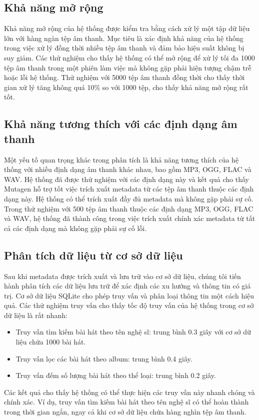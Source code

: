 \documentclass[conference]{IEEEtran}
\begin{document}
\subsection{Khả năng mở rộng}
Khả năng mở rộng của hệ thống được kiểm tra bằng cách xử lý một tập dữ liệu lớn với hàng ngàn tệp âm thanh. Mục tiêu là xác định khả năng của hệ thống trong việc xử lý đồng thời nhiều tệp âm thanh và đảm bảo hiệu suất không bị suy giảm. Các thử nghiệm cho thấy hệ thống có thể mở rộng để xử lý tối đa 1000 tệp âm thanh trong một phiên làm việc mà không gặp phải hiện tượng chậm trễ hoặc lỗi hệ thống. Thử nghiệm với 5000 tệp âm thanh đồng thời cho thấy thời gian xử lý tăng không quá 10\% so với 1000 tệp, cho thấy khả năng mở rộng rất tốt.

\subsection{Khả năng tương thích với các định dạng âm thanh}
Một yếu tố quan trọng khác trong phân tích là khả năng tương thích của hệ thống với nhiều định dạng âm thanh khác nhau, bao gồm MP3, OGG, FLAC và WAV. Hệ thống đã được thử nghiệm với các định dạng này và kết quả cho thấy Mutagen hỗ trợ tốt việc trích xuất metadata từ các tệp âm thanh thuộc các định dạng này. Hệ thống có thể trích xuất đầy đủ metadata mà không gặp phải sự cố. Trong thử nghiệm với 500 tệp âm thanh thuộc các định dạng MP3, OGG, FLAC và WAV, hệ thống đã thành công trong việc trích xuất chính xác metadata từ tất cả các định dạng mà không gặp phải sự cố lỗi.

\subsection{Phân tích dữ liệu từ cơ sở dữ liệu}
Sau khi metadata được trích xuất và lưu trữ vào cơ sở dữ liệu, chúng tôi tiến hành phân tích các dữ liệu lưu trữ để xác định các xu hướng và thông tin có giá trị. Cơ sở dữ liệu SQLite cho phép truy vấn và phân loại thông tin một cách hiệu quả. Các thử nghiệm truy vấn cho thấy tốc độ truy vấn của hệ thống trong cơ sở dữ liệu là rất nhanh:
\begin{itemize}
    \item Truy vấn tìm kiếm bài hát theo tên nghệ sĩ: trung bình 0.3 giây với cơ sở dữ liệu chứa 1000 bài hát.
    \item Truy vấn lọc các bài hát theo album: trung bình 0.4 giây.
    \item Truy vấn đếm số lượng bài hát theo thể loại: trung bình 0.2 giây.
\end{itemize}
Các kết quả cho thấy hệ thống có thể thực hiện các truy vấn này nhanh chóng và chính xác. Ví dụ, truy vấn tìm kiếm bài hát theo tên nghệ sĩ có thể hoàn thành trong thời gian ngắn, ngay cả khi cơ sở dữ liệu chứa hàng nghìn tệp âm thanh.
\end{document}
